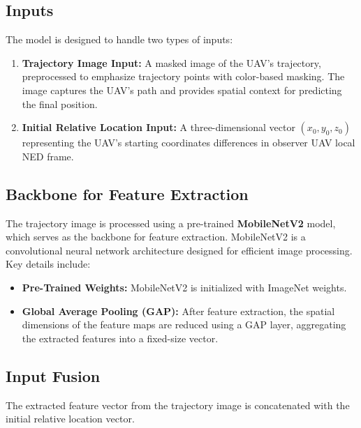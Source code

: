 \subsection{Inputs}
The model is designed to handle two types of inputs:
\begin{enumerate}
    \item \textbf{Trajectory Image Input:} A masked image of the UAV’s trajectory, preprocessed to emphasize trajectory points with color-based masking. The image captures the UAV’s path and provides spatial context for predicting the final position.
    \item \textbf{Initial Relative Location Input:} A three-dimensional vector \((x_0, y_0, z_0)\) representing the UAV's starting coordinates differences in observer UAV local NED frame. 
\end{enumerate}

\subsection{Backbone for Feature Extraction}
The trajectory image is processed using a pre-trained \textbf{MobileNetV2} model, which serves as the backbone for feature extraction. MobileNetV2 is a convolutional neural network architecture designed for efficient image processing. Key details include:
\begin{itemize}
    \item \textbf{Pre-Trained Weights:} MobileNetV2 is initialized with ImageNet weights.
    \item \textbf{Global Average Pooling (GAP):} After feature extraction, the spatial dimensions of the feature maps are reduced using a GAP layer, aggregating the extracted features into a fixed-size vector.
\end{itemize}

\subsection{Input Fusion}
The extracted feature vector from the trajectory image is concatenated with the initial relative location vector. 
